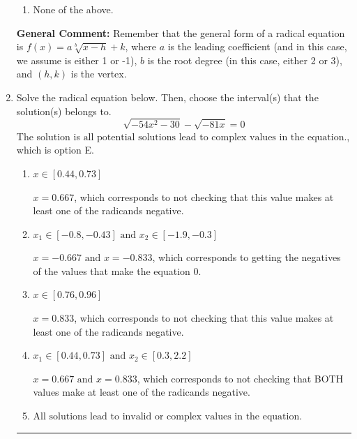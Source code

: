 \documentclass{extbook}[14pt]
\newcommand{\litem}[1]{\item #1

\rule{\textwidth}{0.4pt}}
\begin{document}
\begin{enumerate}
{\begin{enumerate}[label=\Alph*.]
\item None of the above.\end{enumerate}
\textbf{General Comment:} Remember that the general form of a radical equation is $ f(x) = a \sqrt[b]{x - h} + k $, where $a$ is the leading coefficient (and in this case, we assume is either 1 or -1), $b$ is the root degree (in this case, either 2 or 3), and $(h, k)$ is the vertex.
}
\litem{
Solve the radical equation below. Then, choose the interval(s) that the solution(s) belongs to.
\[ \sqrt{-54 x^2 - 30} - \sqrt{-81 x} = 0 \]
The solution is \( \text{all potential solutions lead to complex values in the equation.} \), which is option E.\begin{enumerate}[label=\Alph*.]
\item \( x \in [0.44,0.73] \)

$x = 0.667$, which corresponds to not checking that this value makes at least one of the radicands negative.
\item \( x_1 \in [-0.8, -0.43] \text{ and } x_2 \in [-1.9,-0.3] \)

$x = -0.667 \text{ and } x = -0.833$, which corresponds to getting the negatives of the values that make the equation 0.
\item \( x \in [0.76,0.96] \)

$x = 0.833$, which corresponds to not checking that this value makes at least one of the radicands negative.
\item \( x_1 \in [0.44, 0.73] \text{ and } x_2 \in [0.3,2.2] \)

$x = 0.667 \text{ and } x = 0.833$, which corresponds to not checking that BOTH values make at least one of the radicands negative.
\item \( \text{All solutions lead to invalid or complex values in the equation.} \)


\end{enumerate}}
\end{enumerate}
\end{document}
